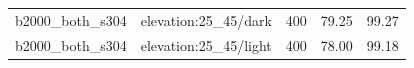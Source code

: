 \begin{longtable}{l>{\raggedright\arraybackslash}p{.42\linewidth}rrr}
b2000\_\allowbreak{}both\_\allowbreak{}s304 & %
elevation:25\_\allowbreak{}45/dark & %
400 & %
79.25 & %
99.27 \\ %

b2000\_\allowbreak{}both\_\allowbreak{}s304 & %
elevation:25\_\allowbreak{}45/light & %
400 & %
78.00 & %
99.18 \\ %


\end{longtable}
